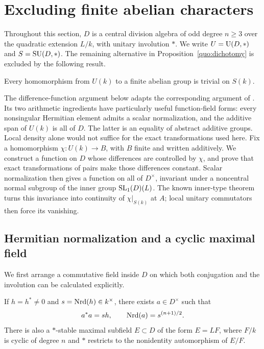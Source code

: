 \section{Excluding finite abelian characters}\label{sec:characters}

Throughout this section, $D$ is a central division algebra of odd degree
$n\geq3$ over the quadratic extension $L/k$, with unitary involution $*$.
We write $U=\operatorname{U}(D,*)$ and $S=\operatorname{SU}(D,*)$. The remaining alternative in
Proposition~\ref{quo:dichotomy} is excluded by the following result.

\begin{theorem}\label{char:trivial}
Every homomorphism from $U(k)$ to a finite abelian group is trivial on
$S(k)$.
\end{theorem}

The difference-function argument below adapts the corresponding argument
of \cite[Section~4]{MPNF}. Its two arithmetic ingredients have particularly
useful function-field forms: every nonsingular Hermitian element admits
a scalar normalization, and the additive span of $U(k)$ is all of $D$.
The latter is an equality of abstract additive groups. Local density alone
would not suffice for the exact transformations used here.
Fix a homomorphism $\chi:U(k)\to B$, with $B$ finite and written additively.
We construct a function on $D$ whose differences are controlled by
$\chi$, and prove that exact transformations of pairs make those
differences constant. Scalar normalization then gives a function on
all of $D^\times$, invariant under a noncentral normal subgroup of
the inner group $\operatorname{SL}_1(D)(L)$. The known inner-type theorem turns this
invariance into continuity of $\chi|_{S(k)}$ at $A$; local unitary
commutators then force its vanishing.

\subsection{Hermitian normalization and a cyclic maximal field}

We first arrange a commutative field inside $D$ on which both conjugation
and the involution can be calculated explicitly.

\begin{lemma}\label{char:normalization}
If $h=h^*\ne0$ and $s=\operatorname{Nrd}(h)\in k^\times$, there exists
$a\in D^\times$ such that
\begin{equation}\label{char:normalized-norm}
 a^*a=sh,\qquad \operatorname{Nrd}(a)=s^{(n+1)/2}.
\end{equation}
There is also a $*$-stable maximal subfield $E\subset D$ of the form
$E=LF$, where $F/k$ is cyclic of degree $n$ and $*$ restricts to the
nonidentity automorphism of $E/F$.
\end{lemma}

